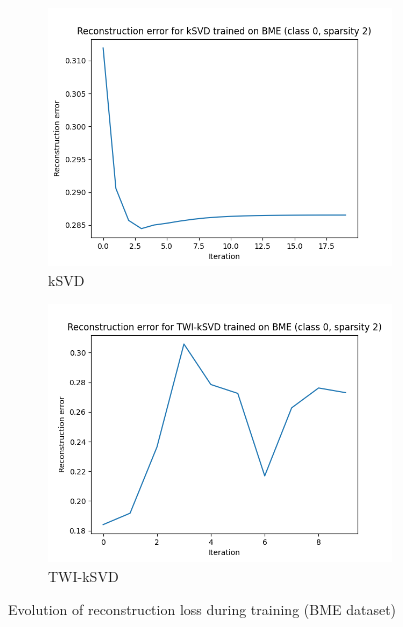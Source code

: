 \documentclass[10pt,twocolumn,letterpaper]{article}
\begin{document}
\begin{figure}
    \centering
    \begin{subfigure}[b]{0.49\textwidth}
      \includegraphics[width=\textwidth]{../../figures/loss_kSVD_spars_2_class_0_BME.png}
      \caption{kSVD}
    \end{subfigure}
    \begin{subfigure}[b]{0.49\textwidth}
        \includegraphics[width=\textwidth]{../../figures/loss_TWI_kSVD_spars_2_class_0_BME.png}
        \caption{TWI-kSVD}
      \end{subfigure}

    \caption{Evolution of reconstruction loss during training (BME dataset)}\label{fig:loss_BME}
\end{figure}
\end{document}
